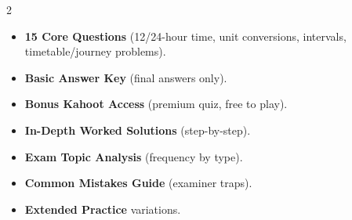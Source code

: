 \documentclass[11pt,a4paper]{article}
\newcommand{\FullReleaseDate}{April 30, 2026}
\begin{document}
\vspace{8pt}

\begin{multicols}{2}
  \begin{tcolorbox}[card, title=\sffamily\bfseries\textcolor{white}{\faHandPointDown\ TODAY (Simplified Version)}, colbacktitle=mainblue, boxed title style={sharp corners, boxrule=0pt}]
    \begin{itemize}[leftmargin=1.2em, itemsep=2pt]
      \item \small \textbf{15 Core Questions} (12/24-hour time, unit conversions, intervals, timetable/journey problems).
      \item \small \textbf{Basic Answer Key} (final answers only).
      \item \small \textbf{Bonus Kahoot Access} (premium quiz, free to play).
    \end{itemize}
  \end{tcolorbox}

  \columnbreak

  \begin{tcolorbox}[card, title=\sffamily\bfseries\textcolor{white}{\faRocket\ ON \FullReleaseDate\ (Full Upgrade)}, colbacktitle=mainblue, boxed title style={sharp corners, boxrule=0pt}]
    \begin{itemize}[leftmargin=1.2em, itemsep=2pt]
      \item \small \textbf{In-Depth Worked Solutions} (step-by-step).
      \item \small \textbf{Exam Topic Analysis} (frequency by type).
      \item \small \textbf{Common Mistakes Guide} (examiner traps).
      \item \small \textbf{Extended Practice} variations.
    \end{itemize}
  \end{tcolorbox}
\end{multicols}
\end{document}
